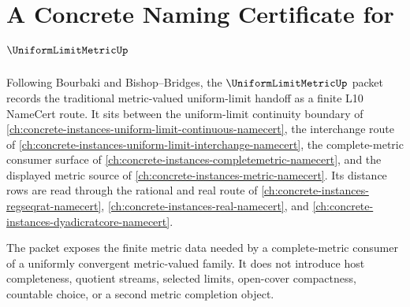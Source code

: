 \chapter{A Concrete Naming Certificate for $\UniformLimitMetricUp$}
\label{ch:concrete-instances-uniform-limit-metric-namecert}

Following Bourbaki and Bishop--Bridges, the $\UniformLimitMetricUp$ packet records the traditional metric-valued uniform-limit handoff as a finite L10 NameCert route. It sits between the uniform-limit continuity boundary of \autoref{ch:concrete-instances-uniform-limit-continuous-namecert}, the interchange route of \autoref{ch:concrete-instances-uniform-limit-interchange-namecert}, the complete-metric consumer surface of \autoref{ch:concrete-instances-completemetric-namecert}, and the displayed metric source of \autoref{ch:concrete-instances-metric-namecert}. Its distance rows are read through the rational and real route of \autoref{ch:concrete-instances-regseqrat-namecert}, \autoref{ch:concrete-instances-real-namecert}, and \autoref{ch:concrete-instances-dyadicratcore-namecert}.

The packet exposes the finite metric data needed by a complete-metric consumer of a uniformly convergent metric-valued family. It does not introduce host completeness, quotient streams, selected limits, open-cover compactness, countable choice, or a second metric completion object.

